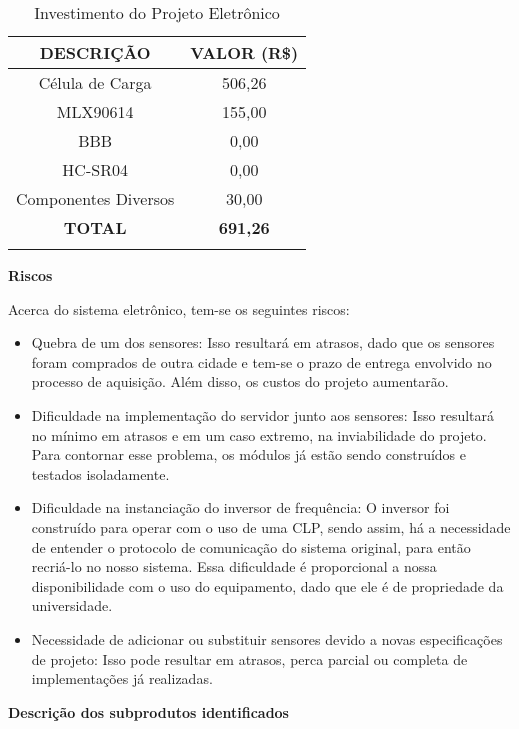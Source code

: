 	\begin{table}[!h]
	\centering
	\caption{Investimento do Projeto Eletrônico}
	\vspace{0.5cm}
	\begin{tabular}{ c c}
	\hline
	\textbf{DESCRIÇÃO}	&	\textbf{VALOR (R\$)}\\
	\hline
	Célula de Carga & 506,26 \\
	\hline
	MLX90614 & 155,00\\
	\hline
	BBB & 0,00\\
	\hline
	HC-SR04 & 0,00\\
	\hline
	Componentes Diversos & 30,00\\
	\hline
	\textbf{TOTAL} & \textbf{691,26}\\
	\hline

	\label{investimentoeletronica}
	\end{tabular}
	\end{table}

	\textbf{Riscos}

	Acerca do sistema eletrônico, tem-se os seguintes riscos:
	\begin{itemize}

		\item Quebra de um dos sensores: Isso resultará em atrasos, dado que os sensores foram comprados de outra cidade e tem-se o prazo de entrega envolvido no processo de aquisição. Além disso, os custos do projeto aumentarão.
		\item Dificuldade na implementação do servidor junto aos sensores: Isso resultará no mínimo em atrasos e em um caso extremo, na inviabilidade do projeto. Para contornar esse problema, os módulos já estão sendo construídos e testados isoladamente.
		\item Dificuldade na instanciação do inversor de frequência: O inversor foi construído para operar com o uso de uma CLP, sendo assim, há a necessidade de entender o protocolo de comunicação do sistema original, para então recriá-lo no nosso sistema. Essa dificuldade é proporcional a nossa disponibilidade com o uso do equipamento, dado que ele é de propriedade da universidade.
		\item Necessidade de adicionar ou substituir sensores devido a novas especificações de projeto: Isso pode resultar em atrasos, perca parcial ou completa de implementações já realizadas.

	\end{itemize}

	\textbf{Descrição dos subprodutos identificados}

